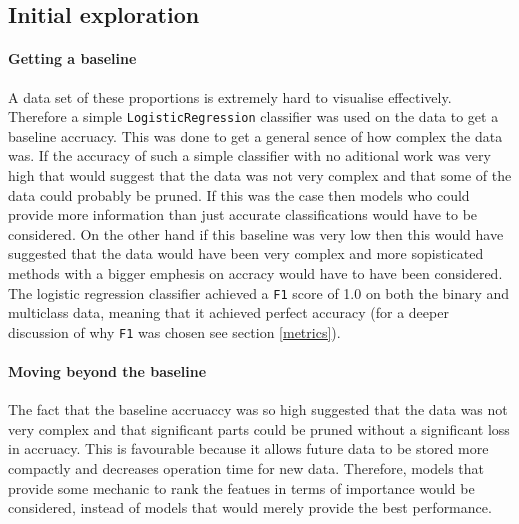 \documentclass[british]{article}
\newcommand{\code}[1]{\texttt{#1}}
\begin{document}
\subsection{Initial exploration}


\paragraph{Getting a baseline}A data set of these proportions is extremely hard to visualise effectively. Therefore a simple \code{LogisticRegression} classifier was used on the data to get a baseline accruacy. This was done to get a general sence of how complex the data was. If the accuracy of such a simple classifier with no aditional work was very high that would suggest that the data was not very complex and that some of the data could probably be pruned. If this was the case then models who could provide more information than just accurate classifications would have to be considered. On the other hand if this baseline was very low then this would have suggested that the data would have been very complex and more sopisticated methods with a bigger emphesis on accracy would have to have been considered. The logistic regression classifier achieved a \code{F1} score of 1.0 on both the binary and multiclass data, meaning that it achieved perfect accuracy (for a deeper discussion of why \code{F1} was chosen see section \ref{metrics}).


\paragraph{Moving beyond the baseline} The fact that the baseline accruaccy was so high suggested that the data was not very complex and that significant parts could be pruned without a significant loss in accruacy. This is favourable because it allows future data to be stored more compactly and decreases operation time for new data. Therefore, models that provide some mechanic to rank the featues in terms of importance would be considered, instead of models that would merely provide the best performance. 


\end{document}
